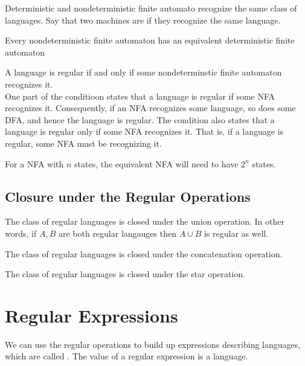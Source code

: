 \documentclass{article}
\begin{document}
Deterministic and nondeterministic finite automato recognize the same class of languages. Say that two machines are  if they recognize the same language. 

\begin{theorem}
  Every nondeterministic finite automaton has an equivalent deterministic finite automaton
\end{theorem}

\begin{lemma}
  A language is regular if and only if some nondeterminstic finite automaton recognizes it. \\ 
  One part of the conditioon states that a language is regular if some NFA recognizes it. Consequently, if an NFA recognizes some language, so does some DFA, and hence the language is regular. The condition also states that a language is regular only if some NFA recognizes it. That is, if a language is regular, some NFA must be recognizing it. 
\end{lemma}

For a NFA with $n$ states, the equivalent NFA will need to have $2^{n}$ states. 

\subsection{Closure under the Regular Operations}

\begin{theorem}
  The class of regular languages is closed under the union operation. In other words, if $A,B$ are both regular langauges then $A \cup B$ is regular as well.  
\end{theorem}

\begin{theorem}
  The class of regular languages is closed under the concatenation operation. 
\end{theorem}

\begin{theorem}
  The class of regular languages is closed under the star operation. 
\end{theorem}

\section{Regular Expressions} 

We can use the regular operations to build up expressions describing languages, which are called . The value of a regular expression is a language. 
\end{document}
